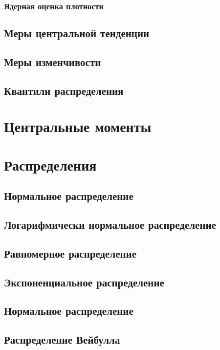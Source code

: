 \documentclass[]{scrartcl}
\begin{document}
\subsubsection{Ядерная оценка плотности}
\subsection{Меры центральной тенденции}

\subsection{Меры изменчивости}

\subsection{Квантили распределения}

\section{Центральные моменты}\label{moments}

\section{Распределения}

\subsection{Нормальное распределение}

\subsection{Логарифмически нормальное распределение}

\subsection{Равномерное распределение}

\subsection{Экспоненциальное распределение}

\subsection{Нормальное распределение}

\subsection{Распределение Вейбулла}
\end{document}
